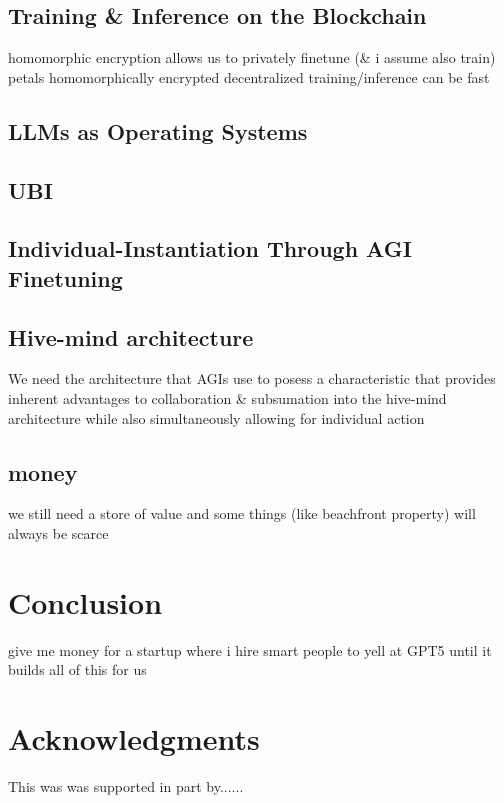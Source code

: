 \documentclass{article}
\begin{document}
\subsection{Training \& Inference on the Blockchain}
homomorphic encryption allows us to privately finetune (\& i assume also train) \cite{panzade2024can}
petals \cite{borzunov2022petals}
homomorphically encrypted decentralized training/inference can be fast\cite{li2024accelerating}

\subsection{LLMs as Operating Systems}

\subsection{UBI}

\subsection{Individual-Instantiation Through AGI Finetuning}

\subsection{Hive-mind architecture}
We need the architecture that AGIs use to posess a characteristic that provides inherent advantages to collaboration \& subsumation into the hive-mind architecture while also simultaneously allowing for individual action

\subsection{money}
we still need a store of value and some things (like beachfront property) will always be scarce



\section{Conclusion}
give me money for a startup where i hire smart people to yell at GPT5 until it builds all of this for us

\section*{Acknowledgments}
This was was supported in part by......
\end{document}
